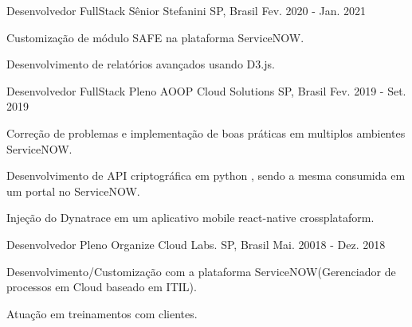 \begin{cventries}
     \cventry
    {Desenvolvedor FullStack Sênior} %
    {Stefanini} %
    {SP, Brasil} %
    {Fev. 2020 - Jan. 2021} %
    {
    	\begin{cvitems} %
    		\item {Customização de módulo SAFE na plataforma ServiceNOW.}
    		\item {Desenvolvimento de relatórios avançados usando D3.js.}    		
    	\end{cvitems}
    }
    \cventry
    {Desenvolvedor FullStack Pleno} %
    {AOOP Cloud Solutions} %
    {SP, Brasil} %
    {Fev. 2019 - Set. 2019} %
    {
      \begin{cvitems} %
        \item {Correção de problemas e implementação de boas práticas em multiplos ambientes ServiceNOW.}
        \item {Desenvolvimento de API criptográfica em python , sendo a mesma consumida em um portal no ServiceNOW.}
        \item {Injeção do Dynatrace em um aplicativo mobile react-native crossplataform.}
      \end{cvitems}
    }   
	\cventry
	{Desenvolvedor Pleno} %
	{Organize Cloud Labs.} %
	{SP, Brasil} %
	{Mai. 20018 - Dez. 2018} %
	{
		\begin{cvitems} %
			\item {Desenvolvimento/Customização com a plataforma ServiceNOW(Gerenciador de processos em Cloud baseado em ITIL).}
			\item {Atuação em treinamentos com clientes.}
		\end{cvitems}
	}

\end{cventries}

